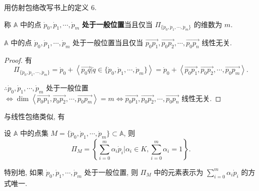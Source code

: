 \documentclass{ctexart}
\begin{document}
用仿射包络改写书上的定义 6.
\begin{definition}[书上的定义 6]
    称 $\mathbb{A}$ 中的点 $\dot{p}_0,\dot{p}_1,\cdots,\dot{p}_m$ \textbf{处于一般位置}当且仅当 $\varPi_{\{\dot{p}_0,\dot{p}_1,\cdots,\dot{p}_m\}}$ 的维数为 $m$.
\end{definition}
\begin{theorem}
    $\mathbb{A}$ 中的点 $\dot{p}_0,\dot{p}_1,\cdots,\dot{p}_m$ 处于一般位置当且仅当 $\overrightarrow{p_0p_1},\overrightarrow{p_0p_2},\cdots,\overrightarrow{p_0p_n}$ 线性无关.
\end{theorem}
\begin{proof}
    有
    \[\varPi_{\{\dot{p}_0,\dot{p}_1,\cdots,\dot{p}_m\}}=\dot{p}_0+\left<\overrightarrow{p_0q}|\dot{q}\in\{\dot{p}_0,\dot{p}_1,\cdots,\dot{p}_m\}\right>=\dot{p}_0+\left<\overrightarrow{p_0p_1},\overrightarrow{p_0p_2},\cdots,\overrightarrow{p_0p_m}\right>.\]

    $\therefore\dot{p}_0,\dot{p}_1,\cdots,\dot{p}_m$ 处于一般位置 $\Leftrightarrow\dim\left<\overrightarrow{p_0p_1},\overrightarrow{p_0p_2},\cdots,\overrightarrow{p_0p_m}\right>=m\Leftrightarrow\overrightarrow{p_0p_1},\overrightarrow{p_0p_2},\cdots,\overrightarrow{p_0p_n}$ 线性无关.
\end{proof}
与线性包络类似, 有
\begin{theorem}
    设 $\mathbb{A}$ 中的点集 $M=\{\dot{p}_0,\dot{p}_1,\cdots,\dot{p}_m\}\subset\mathbb{A}$, 则
    \[\varPi_M=\left\{\sum\limits_{i=0}^m\alpha_i\dot{p}_i\bigg|\alpha_i\in K,\sum\limits_{i=0}^m\alpha_i=1\right\}.\]

    特别地, 如果 $\dot{p}_0,\dot{p}_1,\cdots,\dot{p}_m$ 处于一般位置, 则 $\varPi_M$ 中的元素表示为 $\sum\limits_{i=0}^m\alpha_i\dot{p}_i$ 的方式唯一.
\end{theorem}
\end{document}
